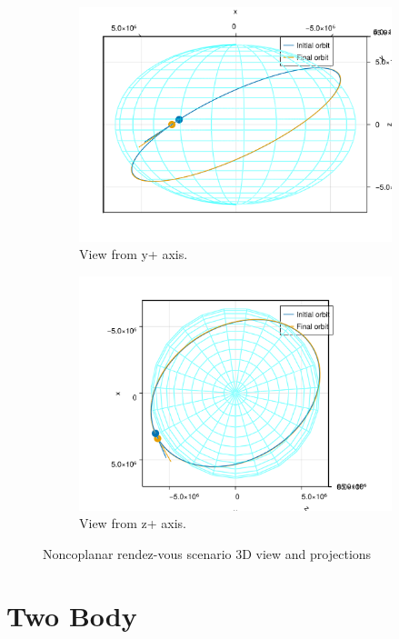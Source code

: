 \begin{figure}[htbp]
\begin{subfigure}{0.49\linewidth}
        \includegraphics[width=\linewidth]{../results/two_body/ipv_noncop/scenario_y+.png}
        \caption{View from y+ axis.}
    \end{subfigure}
    \begin{subfigure}{0.49\linewidth}
        \includegraphics[width=\linewidth]{../results/two_body/ipv_noncop/scenario_z+.png}
        \caption{View from z+ axis.}
    \end{subfigure}
    \caption{Noncoplanar rendez-vous scenario 3D view and projections}
    \label{fig:noncop_rdv_scenario}
\end{figure}

\FloatBarrier
\section{Two Body}

